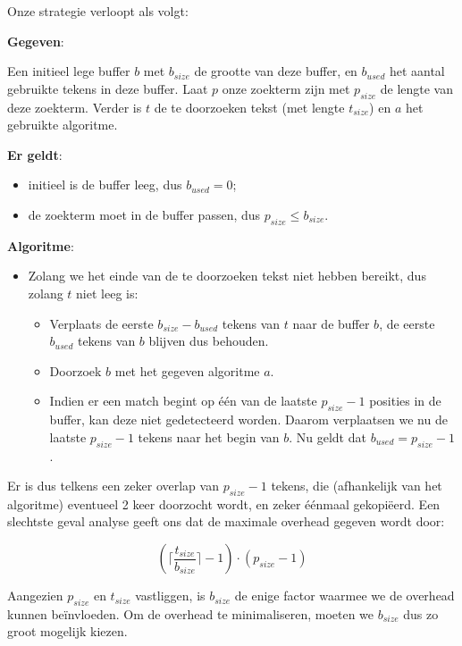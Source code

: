 \documentclass[a4paper,11pt]{article}
\begin{document}
Onze strategie verloopt als volgt:

\textbf{Gegeven}:

Een initieel lege buffer $b$ met $b_{size}$ de grootte van deze buffer, en
$b_{used}$ het aantal gebruikte tekens in deze buffer. Laat $p$ onze zoekterm
zijn met $p_{size}$ de lengte van deze zoekterm. Verder is $t$ de te
doorzoeken tekst (met lengte $t_{size}$) en $a$ het gebruikte algoritme.

\textbf{Er geldt}:

\begin{itemize}
    \item initieel is de buffer leeg, dus $b_{used} = 0$;
    \item de zoekterm moet in de buffer passen, dus $p_{size} \leq b_{size}$.
\end{itemize}

\textbf{Algoritme}:

\begin{itemize}
    \item Zolang we het einde van de te doorzoeken tekst niet hebben bereikt,
    dus zolang $t$ niet leeg is:
    \begin{itemize}
        \item Verplaats de eerste $b_{size} - b_{used}$ tekens van $t$ naar de
        buffer $b$, de eerste $b_{used}$ tekens van $b$ blijven dus behouden.
        \item Doorzoek $b$ met het gegeven algoritme $a$.
        \item Indien er een match begint op \'e\'en van de
        laatste $p_{size} - 1$ posities in de buffer, kan deze niet gedetecteerd
        worden. Daarom verplaatsen we nu de laatste $p_{size} - 1$ tekens naar
        het begin van $b$. Nu geldt dat $b_{used} = p_{size} - 1$.
    \end{itemize}
\end{itemize}

Er is dus telkens een zeker overlap van $p_{size} - 1$ tekens, die (afhankelijk
van het algoritme) eventueel 2 keer doorzocht wordt, en zeker \'e\'enmaal
gekopi\"eerd. Een slechtste geval analyse geeft ons dat de maximale overhead
gegeven wordt door:

\begin{equation*}
\left( \lceil \frac{t_{size}}{b_{size}} \rceil - 1 \right)
    \cdot \left( p_{size} - 1 \right)
\end{equation*}

Aangezien $p_{size}$ en $t_{size}$ vastliggen, is $b_{size}$ de enige factor
waarmee we de overhead kunnen be\"invloeden. Om de overhead te minimaliseren,
moeten we $b_{size}$ dus zo groot mogelijk kiezen.
\end{document}

